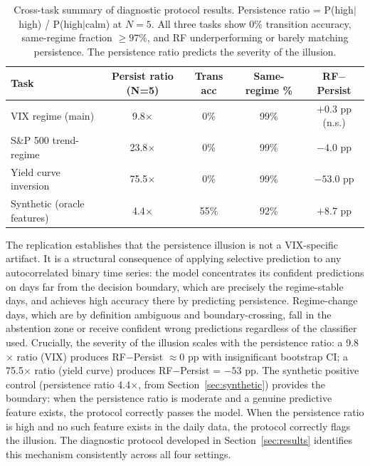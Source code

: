 \documentclass[11pt]{article}
\begin{document}
\begin{table}[H]
\centering
\caption{Cross-task summary of diagnostic protocol results. Persistence ratio = P(high$\mid$high) / P(high$\mid$calm) at $N = 5$. All three tasks show 0\% transition accuracy, same-regime fraction $\geq 97\%$, and RF underperforming or barely matching persistence. The persistence ratio predicts the severity of the illusion.}
\label{tab:cross_task}
\begin{tabular}{lcccc}
\toprule
Task & Persist ratio (N=5) & Trans acc & Same-regime \% & RF$-$Persist \\
\midrule
VIX regime (main)           & 9.8$\times$  & 0\% & 99\%  & $+0.3$ pp (n.s.) \\
S\&P 500 trend-regime       & 23.8$\times$ & 0\% & 99\%  & $-4.0$ pp \\
Yield curve inversion       & 75.5$\times$ & 0\% & 99\%  & $-53.0$ pp \\
\midrule
Synthetic (oracle features) & 4.4$\times$  & 55\% & 92\% & $+8.7$ pp \\
\bottomrule
\end{tabular}
\end{table}

The replication establishes that the persistence illusion is not a VIX-specific artifact. It is a structural consequence of applying selective prediction to any autocorrelated binary time series: the model concentrates its confident predictions on days far from the decision boundary, which are precisely the regime-stable days, and achieves high accuracy there by predicting persistence. Regime-change days, which are by definition ambiguous and boundary-crossing, fall in the abstention zone or receive confident wrong predictions regardless of the classifier used. Crucially, the severity of the illusion scales with the persistence ratio: a 9.8$\times$ ratio (VIX) produces RF$-$Persist $\approx 0$ pp with insignificant bootstrap CI; a 75.5$\times$ ratio (yield curve) produces RF$-$Persist = $-53$ pp. The synthetic positive control (persistence ratio 4.4$\times$, from Section~\ref{sec:synthetic}) provides the boundary: when the persistence ratio is moderate and a genuine predictive feature exists, the protocol correctly passes the model. When the persistence ratio is high and no such feature exists in the daily data, the protocol correctly flags the illusion. The diagnostic protocol developed in Section~\ref{sec:results} identifies this mechanism consistently across all four settings.

\end{document}
